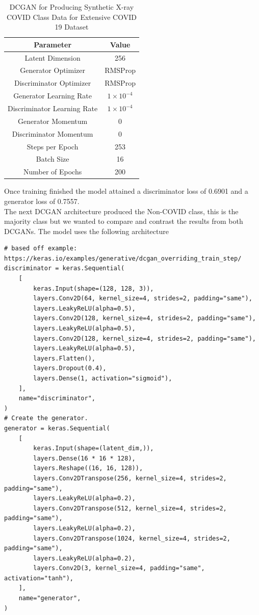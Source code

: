 \begin{table}[H]
    \centering
    \begin{tabular}{|c|c|}
    \hline
        Parameter
        & Value\\
         \hline
          Latent Dimension & 256\\
          Generator Optimizer & RMSProp \\
          Discriminator Optimizer & RMSProp\\
          Generator Learning Rate & $1\times10^{-4}$\\
          Discriminator Learning Rate & $1\times10^{-4}$\\
          Generator Momentum & 0\\
          Discriminator Momentum & 0\\
          Steps per Epoch & 253\\
          Batch Size &  16\\
          Number of Epochs & 200 \\
         \hline
    \end{tabular}
    \caption{DCGAN for Producing Synthetic X-ray COVID Class Data for Extensive COVID 19 Dataset}
    \label{tab:DCGAN for Producing Synthetic X-ray COVID Class Data for Extensive COVID 19 Dataset}
\end{table}
Once training finished the model attained a discriminator loss of 0.6901 and a generator loss of 0.7557.
\\ 
The next DCGAN architecture produced the Non-COVID class, this is the majority class but we wanted to compare and contrast the results from both DCGANs.  The model uses the following architecture 
\begin{verbatim}
# based off example: https://keras.io/examples/generative/dcgan_overriding_train_step/
discriminator = keras.Sequential(
    [
        keras.Input(shape=(128, 128, 3)),
        layers.Conv2D(64, kernel_size=4, strides=2, padding="same"),
        layers.LeakyReLU(alpha=0.5),
        layers.Conv2D(128, kernel_size=4, strides=2, padding="same"),
        layers.LeakyReLU(alpha=0.5),
        layers.Conv2D(128, kernel_size=4, strides=2, padding="same"),
        layers.LeakyReLU(alpha=0.5),
        layers.Flatten(),
        layers.Dropout(0.4),
        layers.Dense(1, activation="sigmoid"),
    ],
    name="discriminator",
)
# Create the generator.
generator = keras.Sequential(
    [
        keras.Input(shape=(latent_dim,)),
        layers.Dense(16 * 16 * 128),
        layers.Reshape((16, 16, 128)),
        layers.Conv2DTranspose(256, kernel_size=4, strides=2, padding="same"),
        layers.LeakyReLU(alpha=0.2),
        layers.Conv2DTranspose(512, kernel_size=4, strides=2, padding="same"),
        layers.LeakyReLU(alpha=0.2),
        layers.Conv2DTranspose(1024, kernel_size=4, strides=2, padding="same"),
        layers.LeakyReLU(alpha=0.2),
        layers.Conv2D(3, kernel_size=4, padding="same", activation="tanh"),
    ],
    name="generator",
)
\end{verbatim}
